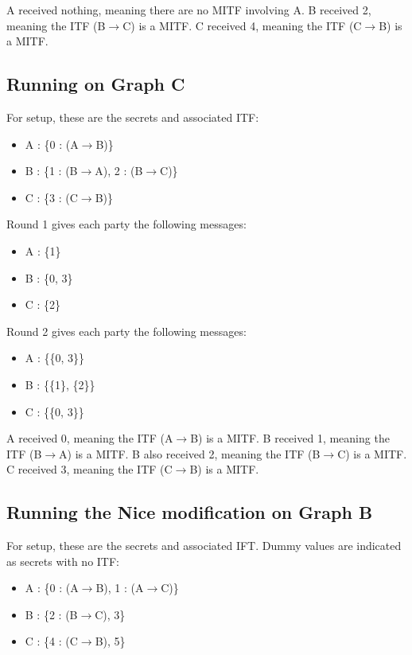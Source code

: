 \documentclass[conference]{IEEEtran}
\begin{document}
A received nothing, meaning there are no MITF involving A. B received 2, meaning the ITF (B$\rightarrow$C) is a MITF. C received 4, meaning the ITF (C$\rightarrow$B) is a MITF.

\subsection{Running on Graph C}
For setup, these are the secrets and associated ITF:
\begin{itemize}
\item A : \{0 : (A$\rightarrow$B)\}
\item B : \{1 : (B$\rightarrow$A), 2 : (B$\rightarrow$C)\}
\item C : \{3 : (C$\rightarrow$B)\}
\end{itemize}

Round 1 gives each party the following messages:
\begin{itemize}
\item A : \{1\}
\item B : \{0, 3\}
\item C : \{2\}
\end{itemize}

Round 2 gives each party the following messages:
\begin{itemize}
\item A : \{\{0, 3\}\}
\item B : \{\{1\}, \{2\}\}
\item C : \{\{0, 3\}\}
\end{itemize}

A received 0, meaning the ITF (A$\rightarrow$B) is a MITF. B received 1, meaning the ITF (B$\rightarrow$A) is a MITF. B also received 2, meaning the ITF (B$\rightarrow$C) is a MITF. C received 3, meaning the ITF (C$\rightarrow$B) is a MITF.

\subsection{Running the Nice modification on Graph B}
For setup, these are the secrets and associated IFT. Dummy values are indicated as secrets with no ITF:
\begin{itemize}
\item A : \{0 : (A$\rightarrow$B), 1 : (A$\rightarrow$C)\}
\item B : \{2 : (B$\rightarrow$C), 3\}
\item C : \{4 : (C$\rightarrow$B), 5\}
\end{itemize}
\end{document}
